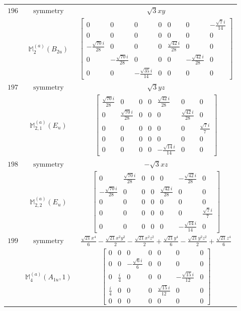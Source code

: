 \documentclass[fleqn,8pt,landscape]{jsarticle}
\begin{document}
\begin{longtable}{ccc}
$ 196 $ & $ \text{symmetry} $ & $ \sqrt{3} x y $ \\
$  $ & $ \mathbb{M}_{2}^{(a)}(B_{2u}) $ & $ \begin{bmatrix} 0 & 0 & 0 & 0 & 0 & 0 & - \frac{\sqrt{7} i}{14} \\ 0 & 0 & 0 & 0 & 0 & 0 & 0 \\ - \frac{\sqrt{70} i}{28} & 0 & 0 & 0 & \frac{\sqrt{42} i}{28} & 0 & 0 \\ 0 & - \frac{\sqrt{70} i}{28} & 0 & 0 & 0 & - \frac{\sqrt{42} i}{28} & 0 \\ 0 & 0 & - \frac{\sqrt{35} i}{14} & 0 & 0 & 0 & 0 \end{bmatrix} $ \\ \hline
$ 197 $ & $ \text{symmetry} $ & $ \sqrt{3} y z $ \\
$  $ & $ \mathbb{M}_{2,1}^{(a)}(E_{u}) $ & $ \begin{bmatrix} \frac{\sqrt{70} i}{28} & 0 & 0 & 0 & \frac{\sqrt{42} i}{28} & 0 & 0 \\ 0 & \frac{\sqrt{70} i}{28} & 0 & 0 & 0 & \frac{\sqrt{42} i}{28} & 0 \\ 0 & 0 & 0 & 0 & 0 & 0 & \frac{\sqrt{7} i}{7} \\ 0 & 0 & 0 & 0 & 0 & 0 & 0 \\ 0 & 0 & 0 & 0 & - \frac{\sqrt{14} i}{14} & 0 & 0 \end{bmatrix} $ \\ \hline
$ 198 $ & $ \text{symmetry} $ & $ - \sqrt{3} x z $ \\
$  $ & $ \mathbb{M}_{2,2}^{(a)}(E_{u}) $ & $ \begin{bmatrix} 0 & \frac{\sqrt{70} i}{28} & 0 & 0 & 0 & - \frac{\sqrt{42} i}{28} & 0 \\ - \frac{\sqrt{70} i}{28} & 0 & 0 & 0 & \frac{\sqrt{42} i}{28} & 0 & 0 \\ 0 & 0 & 0 & 0 & 0 & 0 & 0 \\ 0 & 0 & 0 & 0 & 0 & 0 & \frac{\sqrt{7} i}{7} \\ 0 & 0 & 0 & 0 & 0 & - \frac{\sqrt{14} i}{14} & 0 \end{bmatrix} $ \\ \hline
$ 199 $ & $ \text{symmetry} $ & $ \frac{\sqrt{21} x^{4}}{6} - \frac{\sqrt{21} x^{2} y^{2}}{2} - \frac{\sqrt{21} x^{2} z^{2}}{2} + \frac{\sqrt{21} y^{4}}{6} - \frac{\sqrt{21} y^{2} z^{2}}{2} + \frac{\sqrt{21} z^{4}}{6} $ \\
$  $ & $ \mathbb{M}_{4}^{(a)}(A_{1u},1) $ & $ \begin{bmatrix} 0 & 0 & 0 & 0 & 0 & 0 & 0 \\ 0 & 0 & - \frac{\sqrt{6} i}{6} & 0 & 0 & 0 & 0 \\ 0 & \frac{i}{4} & 0 & 0 & 0 & - \frac{\sqrt{15} i}{12} & 0 \\ \frac{i}{4} & 0 & 0 & 0 & \frac{\sqrt{15} i}{12} & 0 & 0 \\ 0 & 0 & 0 & 0 & 0 & 0 & 0 \end{bmatrix} $ \\ \hline

\end{longtable}
\end{document}
